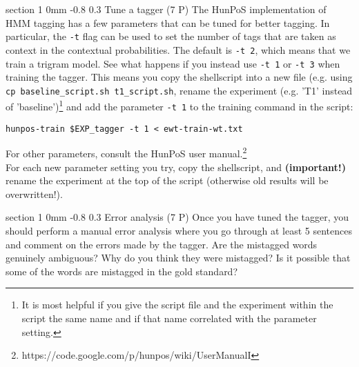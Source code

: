 \documentclass[11pt]{article}
\makeatletter
\newcommand{\newsec}[2]{\section{#1}\label{sec:#2}\noindent}
\renewcommand{\section}{\@startsection
{section}%
{1}%
{0mm}%
{-0.8\baselineskip}%
{0.3\baselineskip}%
{\bfseries\large}}%
\makeatother
\begin{document}
\newsec{Tune a tagger (7 P)}{tune}%
The HunPoS implementation of HMM tagging has a few parameters that can
be tuned for better tagging. In particular, the {\tt -t} flag can be
used to set the number of tags that are taken as context in the
contextual probabilities. The default is {\tt -t $\!\!$2}, which means
that we train a trigram model. See what happens if you instead use
{\tt -t $\!\!$1} or {\tt -t $\!\!$3} when training the tagger. This
means you copy the shellscript into a new file (e.g. using \texttt{cp
  baseline\_script.sh t1\_script.sh}, rename the experiment (e.g. 'T1'
instead of 'baseline')\footnote{It is most helpful if you give the
  script file and the experiment within the script the same name and
  if that name correlated with the parameter setting.} and add the
parameter \texttt{-t 1} to the training command in the script:
\begin{verbatim}
hunpos-train $EXP_tagger -t 1 < ewt-train-wt.txt
\end{verbatim}
For other parameters, consult the HunPoS user manual.\footnote{https://code.google.com/p/hunpos/wiki/UserManualI}\\
For each new parameter setting you try, copy the shellscript, and
\textbf{(important!)} rename the experiment at the top of the script
(otherwise old results will be overwritten!).

\newsec{Error analysis (7 P)}{error}%
Once you have tuned the tagger, you should perform a manual error
analysis where you go through at least 5 sentences and comment on the
errors made by the tagger.  Are the mistagged words genuinely
ambiguous? Why do you think they were mistagged? Is it possible that
some of the words are mistagged in the gold standard?
\end{document}
